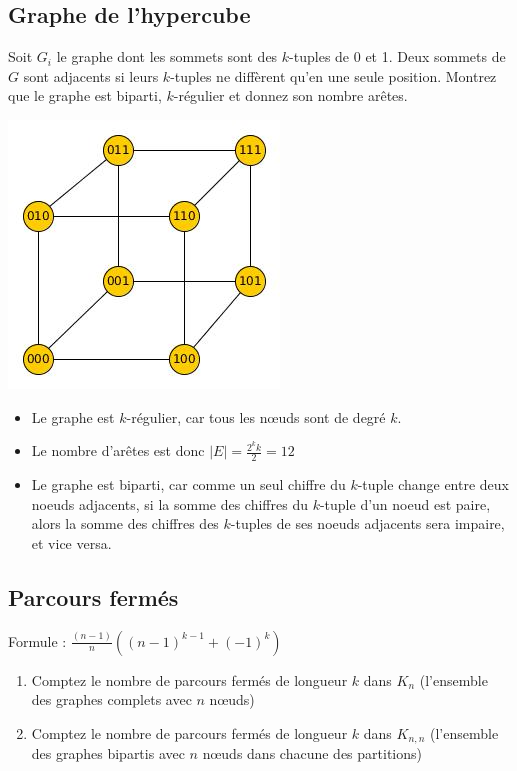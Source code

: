 \subsection{Graphe de l'hypercube}
Soit $G_{i}$ le graphe dont les sommets sont des $k$-tuples de 0 et 1.
Deux sommets de $G$ sont adjacents si leurs $k$-tuples ne diffèrent qu'en une seule position.
Montrez que le graphe est biparti, $k$-régulier et donnez son nombre arêtes.

\begin{solution}
  \begin{minipage}{0.35\textwidth}
    \begin{flushleft}
      \includegraphics[scale=0.4]{graph_ape1_ex3}
    \end{flushleft}
  \end{minipage}
  \begin{minipage}{0.65\textwidth}
    \begin{flushright}
      \begin{itemize}
        \item Le graphe est $k$-régulier, car tous les nœuds sont de degré $k$.
        \item Le nombre d'arêtes est donc $|E| = \frac{2^{k} k}{2} = 12$
        \item Le graphe est biparti, car comme un seul chiffre du $k$-tuple change entre deux noeuds adjacents,
          si la somme des chiffres du $k$-tuple d'un noeud est paire, alors la somme des chiffres des $k$-tuples de ses noeuds adjacents sera impaire, et vice versa.
      \end{itemize}
    \end{flushright}
  \end{minipage}
\end{solution}

\subsection{Parcours fermés}
Formule : $\frac{(n-1)}{n}((n-1)^{k-1}+(-1)^{k})$
\begin{enumerate}
\item{Comptez le nombre de parcours fermés de longueur $k$ dans $K_{n}$ (l'ensemble des graphes complets avec $n$ nœuds)}
\item{Comptez le nombre de parcours fermés de longueur $k$ dans $K_{n,n}$ (l'ensemble des graphes bipartis avec $n$ nœuds dans chacune des partitions)}
\end{enumerate}

